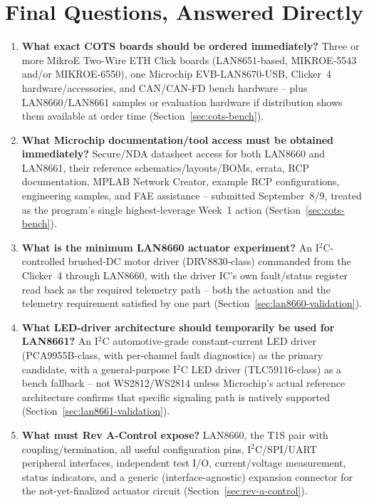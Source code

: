 \section{Final Questions, Answered Directly}
\label{sec:final-questions}

\begin{enumerate}[itemsep=0.4em]

\item \textbf{What exact COTS boards should be ordered immediately?}
Three or more MikroE Two-Wire ETH Click boards (LAN8651-based, MIKROE-5543 and/or MIKROE-6550), one Microchip EVB-LAN8670-USB, Clicker~4 hardware/accessories, and CAN/CAN-FD bench hardware -- plus LAN8660/LAN8661 samples or evaluation hardware if distribution shows them available at order time (Section~\ref{sec:cots-bench}).

\item \textbf{What Microchip documentation/tool access must be obtained immediately?}
Secure/NDA datasheet access for both LAN8660 and LAN8661, their reference schematics/layouts/BOMs, errata, RCP documentation, MPLAB Network Creator, example RCP configurations, engineering samples, and FAE assistance -- submitted September~8/9, treated as the program's single highest-leverage Week~1 action (Section~\ref{sec:cots-bench}).

\item \textbf{What is the minimum LAN8660 actuator experiment?}
An I$^2$C-controlled brushed-DC motor driver (DRV8830-class) commanded from the Clicker~4 through LAN8660, with the driver IC's own fault/status register read back as the required telemetry path -- both the actuation and the telemetry requirement satisfied by one part (Section~\ref{sec:lan8660-validation}).

\item \textbf{What LED-driver architecture should temporarily be used for LAN8661?}
An I$^2$C automotive-grade constant-current LED driver (PCA9955B-class, with per-channel fault diagnostics) as the primary candidate, with a general-purpose I$^2$C LED driver (TLC59116-class) as a bench fallback -- not WS2812/WS2814 unless Microchip's actual reference architecture confirms that specific signaling path is natively supported (Section~\ref{sec:lan8661-validation}).

\item \textbf{What must Rev A-Control expose?}
LAN8660, the T1S pair with coupling/termination, all useful configuration pins, I$^2$C/SPI/UART peripheral interfaces, independent test I/O, current/voltage measurement, status indicators, and a generic (interface-agnostic) expansion connector for the not-yet-finalized actuator circuit (Section~\ref{sec:rev-a-control}).


\end{enumerate}
